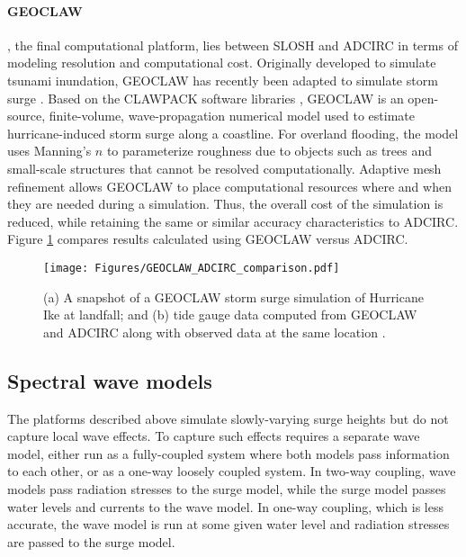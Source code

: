 \paragraph{GEOCLAW} , the final computational platform, lies between SLOSH and ADCIRC in terms of modeling resolution and computational cost. Originally developed to simulate tsunami inundation, GEOCLAW has recently been adapted to simulate storm surge \citep{berger2011geoclaw, mandli2016clawpack}. Based on the CLAWPACK software libraries \citep{leveque2002finite}, GEOCLAW is an open-source, finite-volume, wave-propagation numerical model used to estimate hurricane-induced storm surge along a coastline. For overland flooding, the model uses Manning's $n$ to parameterize roughness due to objects such as trees and small-scale structures that cannot be resolved computationally. Adaptive mesh refinement allows GEOCLAW to place computational resources where and when they are needed during a simulation. Thus, the overall cost of the simulation is reduced, while retaining the same or similar accuracy characteristics to ADCIRC. Figure \ref{fig:GEOCLAW_ADCIRC_comparison} compares results calculated using GEOCLAW versus ADCIRC. 

\begin{figure}[htb]
    \centering
    \texttt{[image: Figures/GEOCLAW\_ADCIRC\_comparison.pdf]}
    \caption{(a) A snapshot of a GEOCLAW storm surge simulation of Hurricane Ike at landfall; and (b) tide gauge data computed from GEOCLAW and ADCIRC along with observed data at the same location \citep{mandli2016clawpack}.}
    \label{fig:GEOCLAW_ADCIRC_comparison}
\end{figure}

\subsection{Spectral wave models}

The platforms described above simulate slowly-varying surge heights but do not capture local wave effects. To capture such effects requires a separate wave model, either run as a fully-coupled system where both models pass information to each other, or as a one-way loosely coupled system. In two-way coupling, wave models pass radiation stresses to the surge model, while the surge model passes water levels and currents to the wave model. In one-way coupling, which is less accurate, the wave model is run at some given water level and radiation stresses are passed to the surge model.

